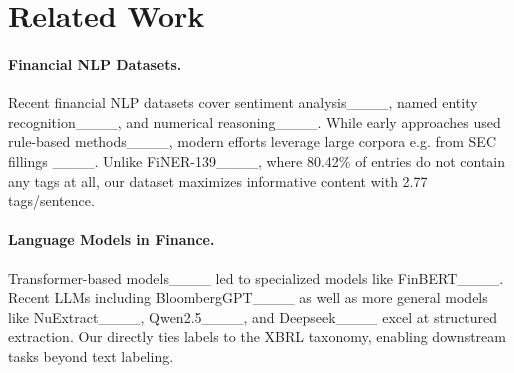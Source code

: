 \section{Related Work}
\paragraph{Financial NLP Datasets.}
Recent financial NLP datasets cover sentiment analysis____, named entity recognition____, and numerical reasoning____.
While early approaches used rule-based methods____, modern efforts leverage large corpora e.g. from SEC fillings ____. 
Unlike FiNER-139____, where 80.42\% of entries do not contain any tags at all, our dataset maximizes informative content with 2.77 tags/sentence.


\paragraph{Language Models in Finance.}
Transformer-based models____ led to specialized models like FinBERT____. 
Recent LLMs including BloombergGPT____ as well as more general models like NuExtract____, Qwen2.5____, and Deepseek____ excel at structured extraction.
Our \hifi{} directly ties labels to the XBRL taxonomy, enabling downstream tasks beyond text labeling.

